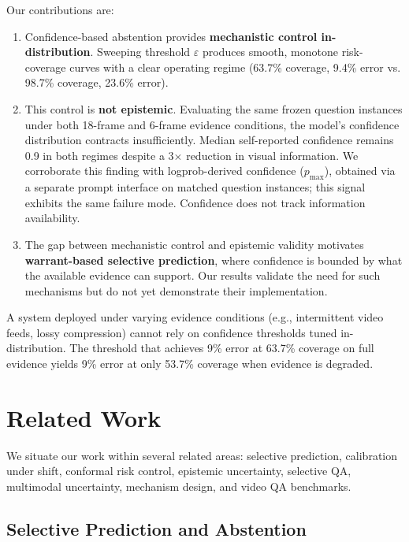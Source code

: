 \documentclass{article}
\begin{document}
Our contributions are:
\begin{enumerate}
    \item Confidence-based abstention provides \textbf{mechanistic control in-distribution}. Sweeping threshold $\varepsilon$ produces smooth, monotone risk-coverage curves with a clear operating regime (63.7\% coverage, 9.4\% error vs. 98.7\% coverage, 23.6\% error).
    
    \item This control is \textbf{not epistemic}. Evaluating the same frozen question instances under both 18-frame and 6-frame evidence conditions, the model's confidence distribution contracts insufficiently. Median self-reported confidence remains 0.9 in both regimes despite a 3$\times$ reduction in visual information. We corroborate this finding with logprob-derived confidence ($p_{\max}$), obtained via a separate prompt interface on matched question instances; this signal exhibits the same failure mode. Confidence does not track information availability.
    
    \item The gap between mechanistic control and epistemic validity motivates \textbf{warrant-based selective prediction}, where confidence is bounded by what the available evidence can support. Our results validate the need for such mechanisms but do not yet demonstrate their implementation.
\end{enumerate}

A system deployed under varying evidence conditions (e.g., intermittent video feeds, lossy compression) cannot rely on confidence thresholds tuned in-distribution. The threshold that achieves 9\% error at 63.7\% coverage on full evidence yields 9\% error at only 53.7\% coverage when evidence is degraded.

\section{Related Work}

We situate our work within several related areas: selective prediction, calibration under shift, conformal risk control, epistemic uncertainty, selective QA, multimodal uncertainty, mechanism design, and video QA benchmarks.

\subsection{Selective Prediction and Abstention}
\end{document}
